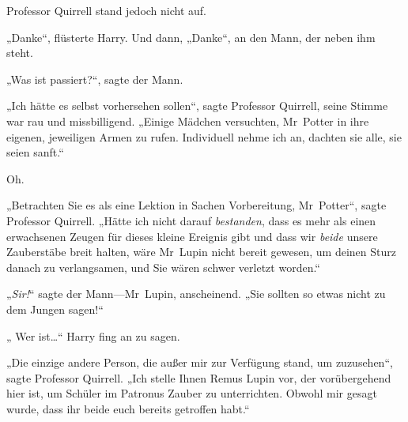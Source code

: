 Professor Quirrell stand jedoch nicht auf.

„Danke“, flüsterte Harry. Und dann, „Danke“, an den Mann, der neben ihm steht.

„Was ist passiert?“, sagte der Mann.

„Ich hätte es selbst vorhersehen sollen“, sagte Professor Quirrell, seine Stimme war rau und missbilligend. „Einige Mädchen versuchten, Mr~Potter in ihre eigenen, jeweiligen Armen zu rufen. Individuell nehme ich an, dachten sie alle, sie seien sanft.“

Oh.

„Betrachten Sie es als eine Lektion in Sachen Vorbereitung, Mr~Potter“, sagte Professor Quirrell. „Hätte ich nicht darauf \emph{bestanden}, dass es mehr als einen erwachsenen Zeugen für dieses kleine Ereignis gibt und dass wir \emph{beide} unsere Zauberstäbe breit halten, wäre Mr~Lupin nicht bereit gewesen, um deinen Sturz danach zu verlangsamen, und Sie wären schwer verletzt worden.“

„\emph{Sir!}“ sagte der Mann—Mr~Lupin, anscheinend. „Sie sollten so etwas nicht zu dem Jungen sagen!“

„ Wer ist…“ Harry fing an zu sagen.

„Die einzige andere Person, die außer mir zur Verfügung stand, um zuzusehen“, sagte Professor Quirrell. „Ich stelle Ihnen Remus Lupin vor, der vorübergehend hier ist, um Schüler im Patronus Zauber zu unterrichten. Obwohl mir gesagt wurde, dass ihr beide euch bereits getroffen habt.“

